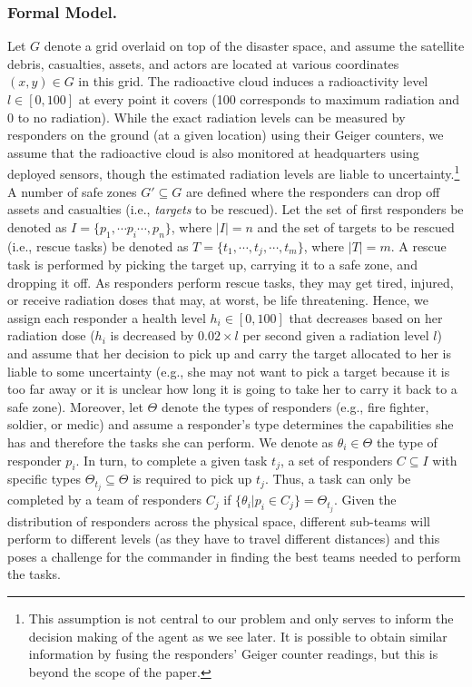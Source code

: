 \subsubsection{Formal Model.}
\noindent Let $G$ denote a grid overlaid on top of the disaster space, and assume the satellite debris, casualties, assets, and actors are located at various coordinates $(x,y) \in G$ in this grid. The radioactive cloud induces a radioactivity level  $l \in [0,100]$ at every point it covers (100 corresponds to maximum radiation and 0 to no radiation). While the exact radiation levels can be measured by responders on the ground (at a given location) using their Geiger counters, we assume that the radioactive cloud is also monitored at headquarters using deployed sensors, though the estimated radiation levels are liable to uncertainty.\footnote{This assumption is not central to our problem and only serves to inform the decision making of the agent as we see later. It is  possible to obtain similar information by fusing the responders' Geiger counter readings, but this is beyond the scope of the paper.}  A number of safe zones $G' \subseteq G$ are defined where the responders can drop off assets and casualties (i.e., \emph{targets} to be rescued). Let the set of first responders be denoted as $I = \{p_1, \cdots p_i \cdots, p_n\}$, where $|I| = n$ and the set of  targets to be rescued (i.e., rescue tasks) be denoted as  $T = \{t_1,\cdots, t_j, \cdots, t_m\}$, where $|T| = m$. A rescue task is performed by picking the target up, carrying it to a safe zone, and dropping it off.  As responders perform rescue tasks, they may get tired, injured, or receive radiation doses that may, at worst, be life threatening. Hence, we assign each responder  a health level $h_i\in [0,100]$ that decreases based on her radiation dose ($h_i$ is decreased by $0.02 \times l$ per second given a radiation level $l$) and assume that her decision to pick up and carry the target allocated to her is liable to some uncertainty (e.g., she may not want to pick a target because it is too far away or it is unclear how long it is going to take her to  carry it back  to a safe zone).  Moreover, let $\Theta$ denote the types of responders (e.g., fire fighter, soldier, or medic)  and assume a responder's type determines the capabilities  she has and therefore the tasks  she can perform. We denote as $\theta_i \in \Theta$ the type of responder $p_i$. In turn, to complete a given task $t_j$,  a set of responders $C \subseteq I$ with specific types $\Theta_{t_j} \subseteq \Theta$ is required to pick up $t_j$. Thus, a task can only be completed by a team of responders $C_j$ if $\{\theta_i | p_i \in C_j\} = \Theta_{t_j}$. Given the distribution of responders across the physical space, different sub-teams will perform to different levels (as they have to travel different distances) and this poses a challenge for the commander in finding the best teams needed to perform the tasks.
